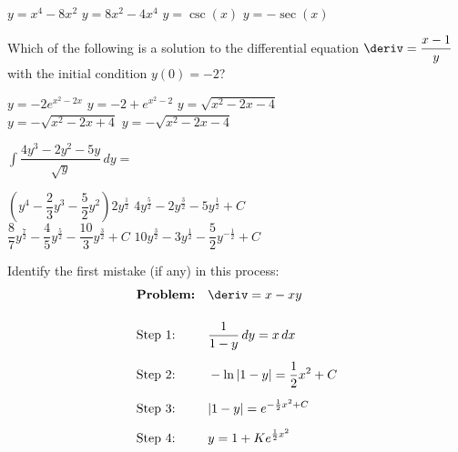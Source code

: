 \begin{questions}
    \begin{oneparchoices}
        \choice $y = x^4 - 8x^2$
        \choice $y = 8x^2 - 4x^4$
        \choice $y = \csc (x)$
        \choice $y = -\sec (x)$
    \end{oneparchoices} \par \horizontalline

    \question Which of the following is a solution to the differential equation $\deriv = \dfrac{x - 1}{y}$ with the initial condition $y(0) = -2$? \\
    
    \begin{oneparchoices}
        \choice $y  = -2e^{x^2 - 2x}$
        \choice $y = -2 + e^{x^2 - 2}$
        \choice $y = \sqrt{x^2 - 2x - 4}$ \\[11pt]
        \makebox[0.17\textwidth] \choice $y = -\sqrt{x^2 - 2x + 4}$
        \makebox[0.2\textwidth] \choice $y = -\sqrt{x^2 - 2x - 4}$
    \end{oneparchoices} \par \horizontalline

    \question $\int \dfrac{4y^3 - 2y^2 - 5y}{\sqrt{y}} \, dy = $ \\

    \begin{oneparchoices}
        \choice $\left(y^4 - \dfrac{2}{3}y^3 - \dfrac{5}{2}y^2\right)2y^{\frac{1}{2}}$ 
        \makebox[0.3\textwidth] \choice $4y^{\frac{5}{2}} - 2y^{\frac{3}{2}} - 5y^{\frac{1}{2}} + C$ \\[11pt]
        \makebox[0.035\textwidth] \choice $\dfrac{8}{7}y^{\frac{7}{2}} - \dfrac{4}{5}y^{\frac{5}{2}} - \dfrac{10}{3}y^{\frac{3}{2}} + C$
        \makebox[0.285\textwidth] \choice $10y^{\frac{3}{2}} - 3y^{\frac{1}{2}} - \dfrac{5}{2}y^{-\frac{1}{2}} + C$
    \end{oneparchoices} \par \horizontalline

    \question Identify the first mistake (if any) in this process: \begin{align*}
        & \textbf{Problem:} && \deriv = x - xy\\[11pt]
        & \text{Step 1:} && \dfrac{1}{1 - y} \, dy = x \, dx \\[5.5pt]
        & \text{Step 2:} && -\ln |1 - y| = \dfrac{1}{2}x^2 + C \\[5.5pt]
        & \text{Step 3:} && |1 - y| = e^{-\frac{1}{2}x^2 + C} \\[5.5pt]
        & \text{Step 4:} && y = 1 + Ke^{\frac{1}{2}x^2}
    \end{align*}


\end{questions}
